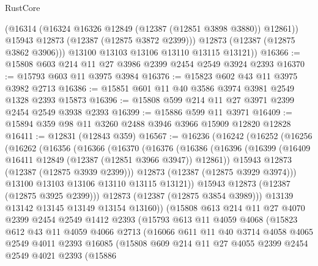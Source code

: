 \begin{lexlean}{RustCore}
\begin{coremodule}
            (@16314 (@16324 @16326 @12849 (@12387 (@12851 @3898 @3880)) @12861))
            @15943
            @12873
            (@12387 (@12875 @3872 @2399)))
          @12873
          (@12387 (@12875 @3862 @3906)))
        @13100
        @13103
        @13106
        @13110
        @13115
        @13121))
@16366 := @15808 @603 @214 @11 @27 @3986 @2399 @2454 @2549 @3924 @2393
@16370 := @15793 @603 @11 @3975 @3984
@16376 := @15823 @602 @43 @11 @3975 @3982 @2713
@16386 := @15851 @601 @11 @40 @3586 @3974 @3981 @2549 @1328 @2393 @15873
@16396 := @15808 @599 @214 @11 @27 @3971 @2399 @2454 @2549 @3938 @2393
@16399 := @15886 @599 @11 @3971
@16409 := @15894 @359 @98 @11 @3260 @2488 @3946 @3966 @15909 @12820 @12828
@16411 := @12831 (@12843 @359)
@16567 := @16236
    (@16242
      (@16252
        (@16256
          (@16262
            (@16356
              (@16366
                (@16370
                  (@16376
                    (@16386
                      (@16396
                        (@16399 (@16409 @16411 @12849 (@12387 (@12851 @3966 @3947)) @12861))
                        @15943
                        @12873
                        (@12387 (@12875 @3939 @2399)))
                      @12873
                      (@12387 (@12875 @3929 @3974)))
                    @13100
                    @13103
                    @13106
                    @13110
                    @13115
                    @13121))
                @15943
                @12873
                (@12387 (@12875 @3925 @2399)))
              @12873
              (@12387 (@12875 @3854 @3989)))
            @13139
            @13142
            @13145
            @13149
            @13154
            @13160))
        (@15808
          @613
          @214
          @11
          @27
          @4070
          @2399
          @2454
          @2549
          @1412
          @2393
          (@15793
            @613
            @11
            @4059
            @4068
            (@15823
              @612
              @43
              @11
              @4059
              @4066
              @2713
              (@16066
                @611
                @11
                @40
                @3714
                @4058
                @4065
                @2549
                @4011
                @2393
                @16085
                (@15808
                  @609
                  @214
                  @11
                  @27
                  @4055
                  @2399
                  @2454
                  @2549
                  @4021
                  @2393
                  (@15886

\end{coremodule}
\end{lexlean}
